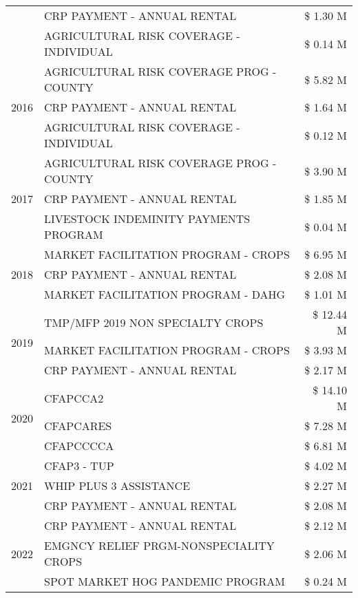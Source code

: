 \begin{tabular}{llr}
 & CRP PAYMENT - ANNUAL RENTAL & \$ 1.30 M \\
 & AGRICULTURAL RISK COVERAGE - INDIVIDUAL & \$ 0.14 M \\
\cline{1-3}
\multirow[t]{3}{*}{2016} & AGRICULTURAL RISK COVERAGE PROG - COUNTY & \$ 5.82 M \\
 & CRP PAYMENT - ANNUAL RENTAL & \$ 1.64 M \\
 & AGRICULTURAL RISK COVERAGE - INDIVIDUAL & \$ 0.12 M \\
\cline{1-3}
\multirow[t]{3}{*}{2017} & AGRICULTURAL RISK COVERAGE PROG - COUNTY & \$ 3.90 M \\
 & CRP PAYMENT - ANNUAL RENTAL & \$ 1.85 M \\
 & LIVESTOCK INDEMINITY PAYMENTS PROGRAM & \$ 0.04 M \\
\cline{1-3}
\multirow[t]{3}{*}{2018} & MARKET FACILITATION PROGRAM - CROPS & \$ 6.95 M \\
 & CRP PAYMENT - ANNUAL RENTAL & \$ 2.08 M \\
 & MARKET FACILITATION PROGRAM - DAHG & \$ 1.01 M \\
\cline{1-3}
\multirow[t]{3}{*}{2019} & TMP/MFP 2019 NON SPECIALTY CROPS & \$ 12.44 M \\
 & MARKET FACILITATION PROGRAM - CROPS & \$ 3.93 M \\
 & CRP PAYMENT - ANNUAL RENTAL & \$ 2.17 M \\
\cline{1-3}
\multirow[t]{3}{*}{2020} & CFAPCCA2 & \$ 14.10 M \\
 & CFAPCARES & \$ 7.28 M \\
 & CFAPCCCCA & \$ 6.81 M \\
\cline{1-3}
\multirow[t]{3}{*}{2021} & CFAP3 - TUP & \$ 4.02 M \\
 & WHIP PLUS 3 ASSISTANCE & \$ 2.27 M \\
 & CRP PAYMENT - ANNUAL RENTAL & \$ 2.08 M \\
\cline{1-3}
\multirow[t]{3}{*}{2022} & CRP PAYMENT - ANNUAL RENTAL & \$ 2.12 M \\
 & EMGNCY RELIEF PRGM-NONSPECIALITY CROPS & \$ 2.06 M \\
 & SPOT MARKET HOG PANDEMIC PROGRAM & \$ 0.24 M \\
\cline{1-3}
\bottomrule
\end{tabular}
